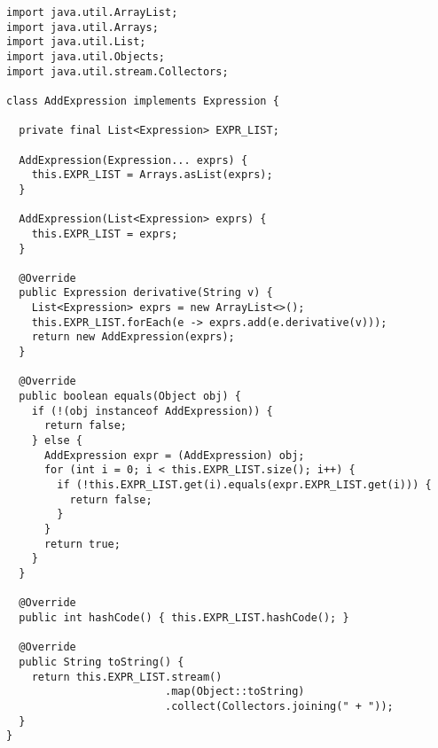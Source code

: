 \begin{lstlisting}[language=MyJava]
import java.util.ArrayList;
import java.util.Arrays;
import java.util.List;
import java.util.Objects;
import java.util.stream.Collectors;

class AddExpression implements Expression {

  private final List<Expression> EXPR_LIST;

  AddExpression(Expression... exprs) {
    this.EXPR_LIST = Arrays.asList(exprs);
  }

  AddExpression(List<Expression> exprs) { 
    this.EXPR_LIST = exprs; 
  }

  @Override
  public Expression derivative(String v) {
    List<Expression> exprs = new ArrayList<>();
    this.EXPR_LIST.forEach(e -> exprs.add(e.derivative(v)));
    return new AddExpression(exprs);
  }

  @Override
  public boolean equals(Object obj) {
    if (!(obj instanceof AddExpression)) { 
      return false; 
    } else { 
      AddExpression expr = (AddExpression) obj;
      for (int i = 0; i < this.EXPR_LIST.size(); i++) {
        if (!this.EXPR_LIST.get(i).equals(expr.EXPR_LIST.get(i))) { 
          return false; 
        }
      }
      return true;
    }
  }

  @Override
  public int hashCode() { this.EXPR_LIST.hashCode(); }

  @Override
  public String toString() { 
    return this.EXPR_LIST.stream()
                         .map(Object::toString)
                         .collect(Collectors.joining(" + "));
  }
}
\end{lstlisting}